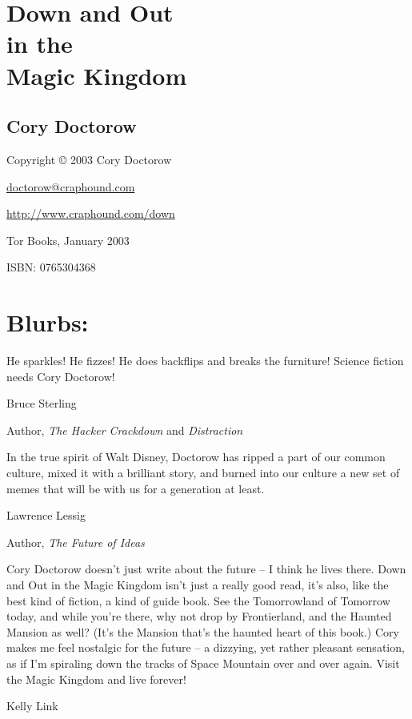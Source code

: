 

\section{Down and Out\\in the\\Magic Kingdom}

\subsection{Cory Doctorow}

Copyright © 2003 Cory Doctorow

\href{mailto:doctorow@craphound.com}{doctorow@craphound.com}

\href{http://www.craphound.com/down}{http://www.craphound.com/down}

Tor Books, January 2003

ISBN: 0765304368

\section{Blurbs:}

He sparkles! He fizzes! He does backflips and breaks the furniture!
Science fiction needs Cory Doctorow!

Bruce Sterling

Author, \emph{The Hacker Crackdown} and \emph{Distraction}

In the true spirit of Walt Disney, Doctorow has ripped a part of
our common culture, mixed it with a brilliant story, and burned
into our culture a new set of memes that will be with us for a
generation at least.

Lawrence Lessig

Author, \emph{The Future of Ideas}

Cory Doctorow doesn't just write about the future -- I think he
lives there. Down and Out in the Magic Kingdom isn't just a really
good read, it's also, like the best kind of fiction, a kind of
guide book. See the Tomorrowland of Tomorrow today, and while
you're there, why not drop by Frontierland, and the Haunted Mansion
as well? (It's the Mansion that's the haunted heart of this book.)
Cory makes me feel nostalgic for the future -- a dizzying, yet
rather pleasant sensation, as if I'm spiraling down the tracks of
Space Mountain over and over again. Visit the Magic Kingdom and
live forever!

Kelly Link


